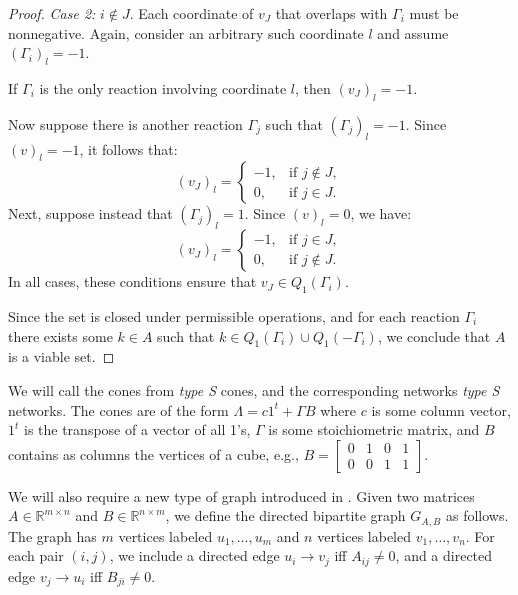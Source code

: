 \documentclass{article}
\begin{document}
\begin{proof}
\textit{Case 2:} \( i \notin J \).  
Each coordinate of \( v_J \) that overlaps with \( \Gamma_i \) must be nonnegative. Again, consider an arbitrary such coordinate \( l \) and assume \( (\Gamma_i)_l = -1 \).

If \( \Gamma_i \) is the only reaction involving coordinate \( l \), then \( (v_J)_l = -1 \).

Now suppose there is another reaction \( \Gamma_j \) such that \( (\Gamma_j)_l = -1 \). Since \( (v)_l = -1 \), it follows that:
\[
(v_J)_l =
\begin{cases}
-1, & \text{if } j \notin J, \\
0, & \text{if } j \in J.
\end{cases}
\]
Next, suppose instead that \( (\Gamma_j)_l = 1 \). Since \( (v)_l = 0 \), we have:
\[
(v_J)_l =
\begin{cases}
-1, & \text{if } j \in J, \\
0, & \text{if } j \notin J.
\end{cases}
\]
In all cases, these conditions ensure that \( v_J \in Q_1(\Gamma_i) \).

Since the set is closed under permissible operations, and for each reaction \( \Gamma_i \) there exists some \( k \in A \) such that \( k \in Q_1(\Gamma_i) \cup Q_1(-\Gamma_i) \), we conclude that \( A \) is a viable set.
 \end{proof}





We will call the cones from \cite{BANAJI20131359} \textit{type S} cones, and the corresponding networks \textit{type S} networks. The cones are of the form $\Lambda = c 1^t + \Gamma B$ where $c$ is some column vector, $1^t$ is the transpose of a vector of all 1's, $\Gamma$ is some stoichiometric matrix, and $B$ contains as columns the vertices of a cube, e.g., $B = \begin{bmatrix} 0 & 1 & 0 & 1 \\ 0 & 0 & 1 & 1 \end{bmatrix}$. 

We will also require a new type of graph introduced in \cite{BANAJI20131359}. Given two matrices \( A \in \mathbb{R}^{m \times n} \) and \( B \in \mathbb{R}^{n \times m} \), we define the directed bipartite graph \( G_{A,B} \) as follows. The graph has \( m \) vertices labeled \( u_1, \ldots, u_m \) and \( n \) vertices labeled \( v_1, \ldots, v_n \). For each pair \( (i, j) \), we include a directed edge \( u_i \to v_j \) iff \( A_{ij} \neq 0 \), and a directed edge \( v_j \to u_i \) iff \( B_{ji} \neq 0 \).
\end{document}
